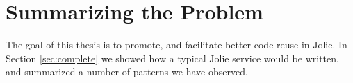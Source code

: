 \section{Summarizing the Problem}

The goal of this thesis is to promote, and facilitate better code reuse in
Jolie. In Section \ref{sec:complete} we showed how a typical Jolie service
would be written, and summarized a number of patterns we have observed.

